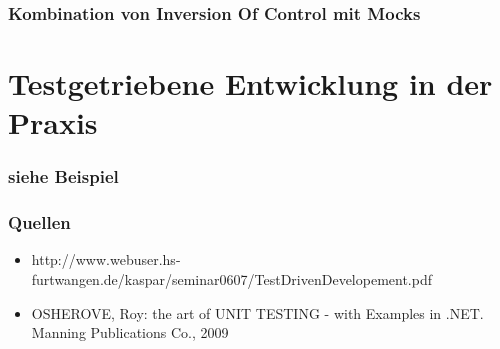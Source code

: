 \documentclass{beamer}
\begin{document}
\begin{frame}
\frametitle{Kombination von Inversion Of Control mit Mocks}
\end{frame}

\section{Testgetriebene Entwicklung in der Praxis}
\begin{frame}
\frametitle{siehe Beispiel}
\end{frame}

\begin{appendix}
\begin{frame}
\frametitle{Quellen}
\begin{itemize}
\item http://www.webuser.hs-furtwangen.de/kaspar/seminar0607/TestDrivenDevelopement.pdf
\item OSHEROVE, Roy: the art of UNIT TESTING - with Examples in .NET. Manning Publications Co., 2009
\end{itemize}
\end{frame}
\end{appendix}
\end{document}
